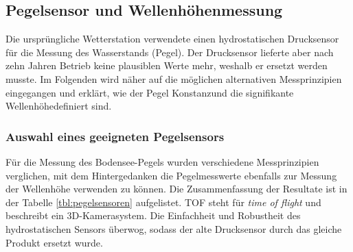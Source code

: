 \subsection{Pegelsensor und Wellenhöhenmessung}
Die ursprüngliche Wetterstation verwendete einen hydrostatischen Drucksensor für die Messung des Wasserstands (Pegel). Der Drucksensor lieferte aber nach zehn Jahren Betrieb keine plausiblen Werte mehr, weshalb er ersetzt werden musste. Im Folgenden wird näher auf die möglichen alternativen Messprinzipien eingegangen und erklärt, wie der \flqq Pegel Konstanz\frqq und die \flqq signifikante Wellenhöhe\frqq definiert sind.

\subsubsection{Auswahl eines geeigneten Pegelsensors}
Für die Messung des Bodensee-Pegels wurden verschiedene Messprinzipien verglichen, mit dem Hintergedanken die Pegelmesswerte ebenfalls zur Messung der Wellenhöhe verwenden zu können. Die Zusammenfassung der Resultate ist in der Tabelle \ref{tbl:pegelsensoren} aufgelistet. TOF steht für \emph{time of flight} und beschreibt ein 3D-Kamerasystem. Die Einfachheit und Robustheit des hydrostatischen Sensors überwog, sodass der alte Drucksensor durch das gleiche Produkt ersetzt wurde.

